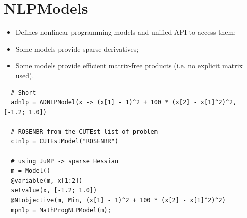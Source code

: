 
\section{NLPModels}

\begin{frame}[fragile,t]

  \begin{itemize}
    \item Defines nonlinear programming models and unified API to access them;
    \item Some models provide sparse derivatives;
    \item Some models provide efficient matrix-free products (i.e. no explicit matrix
      used).
  \end{itemize}
\end{frame}

\begin{frame}[fragile,t]
\begin{lstlisting}
  # Short
  adnlp = ADNLPModel(x -> (x[1] - 1)^2 + 100 * (x[2] - x[1]^2)^2, [-1.2; 1.0])

  # ROSENBR from the CUTEst list of problem
  ctnlp = CUTEstModel("ROSENBR")

  # using JuMP -> sparse Hessian
  m = Model()
  @variable(m, x[1:2])
  setvalue(x, [-1.2; 1.0])
  @NLobjective(m, Min, (x[1] - 1)^2 + 100 * (x[2] - x[1]^2)^2)
  mpnlp = MathProgNLPModel(m);
\end{lstlisting}
\end{frame}

